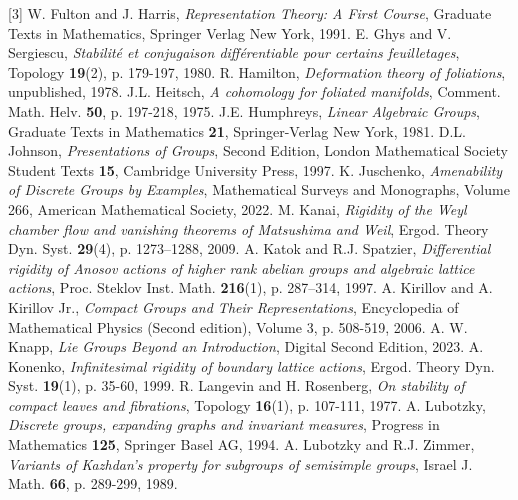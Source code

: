 \documentclass[11pt, letterpaper, oneside,reqno]{amsart}
\theoremstyle{plain}
\theoremstyle{underline}
\theoremstyle{definition}
\theoremstyle{remark}
\begin{document}
\begin{thebibliography}{[3]}
			 W. Fulton and J. Harris, \textit{Representation Theory: A First Course}, Graduate Texts in Mathematics, Springer Verlag New York, 1991.
			 E. Ghys and V. Sergiescu, \textit{Stabilité et conjugaison différentiable pour certains feuilletages}, Topology \textbf{19}(2), p. 179-197, 1980.
			 R. Hamilton, \textit{Deformation theory of foliations}, unpublished, 1978.
			 J.L. Heitsch, \textit{A cohomology for foliated manifolds}, Comment. Math. Helv. \textbf{50}, p. 197-218, 1975.
			 J.E. Humphreys, \textit{Linear Algebraic Groups}, Graduate Texts in Mathematics \textbf{21}, Springer-Verlag New York, 1981. 
			 D.L. Johnson, \textit{Presentations of Groups}, Second Edition, London Mathematical Society Student Texts \textbf{15}, Cambridge University Press, 1997.
			 K. Juschenko, \textit{Amenability of Discrete Groups by Examples}, Mathematical Surveys and Monographs, Volume 266, American Mathematical Society, 2022.
			 M. Kanai, \textit{Rigidity of the Weyl chamber flow and vanishing theorems of Matsushima and Weil}, Ergod. Theory Dyn. Syst. \textbf{29}(4), p. 1273–1288, 2009.
			 A. Katok and R.J. Spatzier, \textit{Differential rigidity of Anosov actions of higher rank abelian groups and algebraic lattice actions}, Proc. Steklov Inst. Math. \textbf{216}(1), p. 287–314, 1997.
			 A. Kirillov and A. Kirillov Jr., \textit{Compact Groups and Their Representations}, Encyclopedia of Mathematical Physics (Second edition), Volume 3, p. 508-519, 2006.
			 A. W. Knapp, \textit{Lie Groups Beyond an Introduction}, Digital Second Edition, 2023.
			 A. Konenko, \textit{Infinitesimal rigidity of boundary lattice actions}, Ergod. Theory Dyn. Syst. \textbf{19}(1), p. 35-60, 1999.
			 R. Langevin and H. Rosenberg, \textit{On stability of compact leaves and fibrations}, Topology \textbf{16}(1), p. 107-111, 1977.
			 A. Lubotzky, \textit{Discrete groups, expanding graphs and invariant measures}, Progress in Mathematics \textbf{125}, Springer Basel AG, 1994.
			 A. Lubotzky and R.J. Zimmer, \textit{Variants of Kazhdan's property for subgroups of semisimple groups}, Israel J. Math. \textbf{66}, p. 289-299, 1989.

\end{thebibliography}
\end{document}
